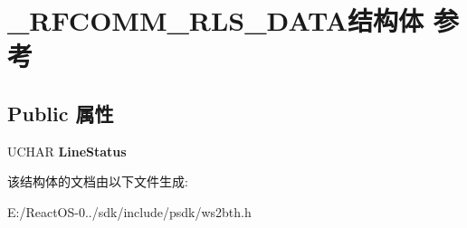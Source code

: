 \hypertarget{struct___r_f_c_o_m_m___r_l_s___d_a_t_a}{}\section{\+\_\+\+R\+F\+C\+O\+M\+M\+\_\+\+R\+L\+S\+\_\+\+D\+A\+T\+A结构体 参考}
\label{struct___r_f_c_o_m_m___r_l_s___d_a_t_a}
\subsection*{Public 属性}
\begin{DoxyCompactItemize}
\item 
\mbox{\label{struct___r_f_c_o_m_m___r_l_s___d_a_t_a_a88e286cfbbf96527d50bd36402960bbf}} 
U\+C\+H\+AR {\bfseries Line\+Status}
\end{DoxyCompactItemize}


该结构体的文档由以下文件生成\+:\begin{DoxyCompactItemize}
\item 
E\+:/\+React\+O\+S-\/0../sdk/include/psdk/ws2bth.\+h\end{DoxyCompactItemize}
